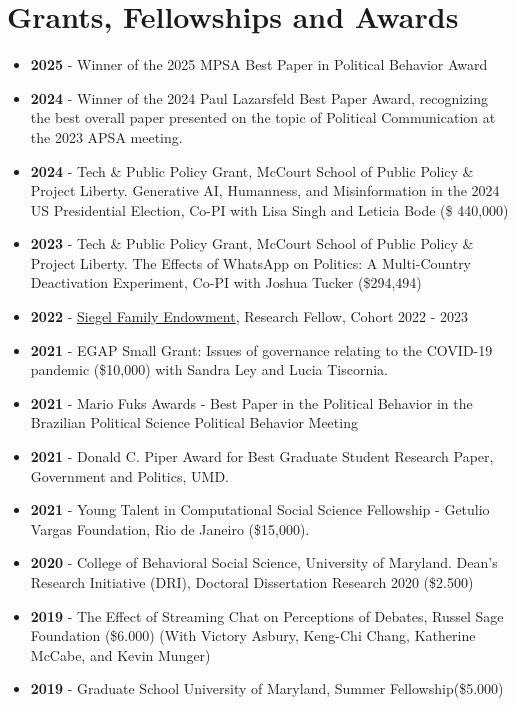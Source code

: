 \documentclass[letterpaper, 11pt]{article}
\begin{document}
\section*{Grants, Fellowships and Awards}
    \begin{itemize}[leftmargin=.45cm]
        \item \textbf{2025} - Winner of the 2025 MPSA Best Paper in Political Behavior Award
        \item \textbf{2024} - Winner of the 2024 Paul Lazarsfeld Best Paper Award, recognizing the best overall paper presented on the topic of Political Communication at the 2023 APSA meeting.
        \item \textbf{2024} - Tech \& Public Policy Grant, McCourt School of Public Policy \& Project Liberty. Generative AI, Humanness, and Misinformation in the 2024 US Presidential Election, Co-PI with Lisa Singh and Leticia Bode (\$ 440,000)
        \item \textbf{2023} - Tech \& Public Policy Grant, McCourt School of Public Policy \& Project Liberty. The Effects of WhatsApp on Politics: A Multi-Country Deactivation Experiment, Co-PI with Joshua Tucker (\$294,494)
         \item \textbf{2022} - \href{https://www.siegelendowment.org/}{Siegel Family Endowment}, Research Fellow, Cohort 2022 - 2023
        \item \textbf{2021} - EGAP Small Grant: Issues of governance relating to the COVID-19 pandemic (\$10,000) with Sandra Ley and Lucia Tiscornia.
           \item \textbf{2021} - Mario Fuks Awards - Best Paper in the Political Behavior in the Brazilian Political Science Political Behavior Meeting
        \item \textbf{2021} - Donald C. Piper Award for Best Graduate Student Research Paper, Government and Politics, UMD.
        \item \textbf{2021} - Young Talent in Computational Social Science Fellowship - Getulio Vargas Foundation, Rio de Janeiro (\$15,000).
        \item \textbf{2020} - College of Behavioral Social Science, University of Maryland. Dean's Research Initiative (DRI), Doctoral Dissertation Research 2020 (\$2.500)
        \item \textbf{2019} - The Effect of Streaming Chat on Perceptions of Debates, Russel Sage Foundation (\$6.000) (With Victory Asbury, Keng-Chi Chang, Katherine McCabe, and Kevin Munger)
        \item \textbf{2019} - Graduate School University of Maryland, Summer Fellowship(\$5.000)

\end{itemize}
\end{document}
